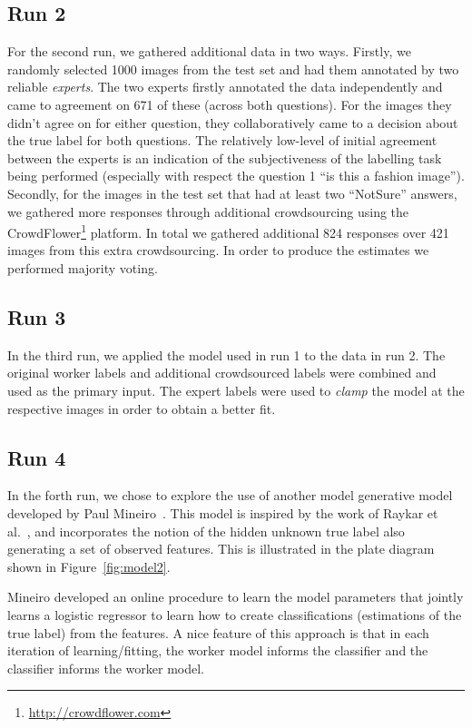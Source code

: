 \documentclass{../acm_proc_article-me11_tweaked}
\begin{document}
\subsection{Run 2}
For the second run, we gathered additional data in two ways. Firstly, we randomly selected 1000 images from the test set and had them annotated by two reliable \emph{experts}. The two experts firstly annotated the data independently and came to agreement on 671 of these (across both questions). For the images they didn't agree on for either question, they collaboratively came to a decision about the true label for both questions. The relatively low-level of initial agreement between the experts is an indication of the subjectiveness of the labelling task being performed (especially with respect the question 1 ``is this a fashion image''). Secondly, for the images in the test set that had at least two ``NotSure'' answers, we gathered more responses through additional crowdsourcing using the CrowdFlower\footnote{\url{http://crowdflower.com}} platform. In total we gathered additional 824 responses over 421 images from this extra crowdsourcing. In order to produce the estimates we performed majority voting. 

\subsection{Run 3}
In the third run, we applied the model used in run 1 to the data in run 2. The original worker labels and additional crowdsourced labels were combined and used as the primary input. The expert labels were used to \emph{clamp} the model at the respective images in order to obtain a better fit.

\subsection{Run 4}
In the forth run, we chose to explore the use of another model generative model developed by Paul Mineiro~\cite{Mineiro20111116}. This model is inspired by the work of Raykar et al.~\cite{Raykar:2010:LC:1756006.1859894}, and incorporates the notion of the hidden unknown true label also generating a set of observed features. This is illustrated in the plate diagram shown in Figure~\ref{fig:model2}.

Mineiro developed an online procedure to learn the model parameters that jointly learns a logistic regressor to learn how to create classifications (estimations of the true label) from the features. A nice feature of this approach is that in each iteration of learning/fitting, the worker model informs the classifier and the classifier informs the worker model.
\end{document}
